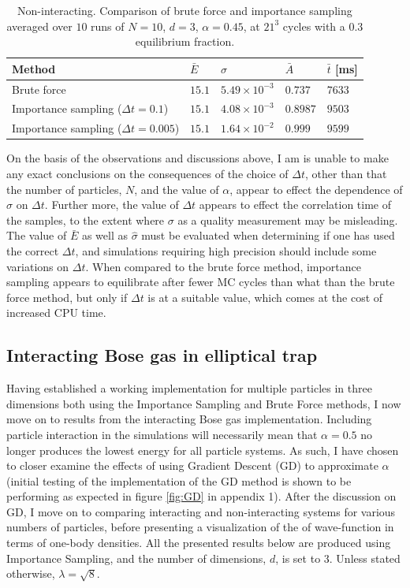 \documentclass[%
oneside,                 %
final,                   %
10pt]{article}
\begin{document}
\begin{table}[h!]
\begin{center}
\begin{tabular}{lllll}
\hline
Method									    & $\bar E $ & $\hat \sigma$		   & $\bar A$ & $\bar t$ [ms]  \\
\hline
Brute force 								& $15.1$  		&$5.49 \times 10^{-3}$ &  $0.737$ & $7633$\\
Importance sampling ($\Delta t=0.1$)		& $15.1$ 		&$4.08 \times 10^{-3}$ &  $0.8987$ & $9503$\\
Importance sampling ($\Delta t=0.005$)		& $15.1$ 		&$1.64 \times 10^{-2}$ &  $0.999$ & $9599$\\
\hline
\end{tabular}
\end{center}
\caption{Non-interacting. Comparison of brute force and importance sampling averaged over $10$ runs of $N=10$, $d=3$, $\alpha=0.45$, at $21^3$  cycles with a $0.3$ equilibrium fraction. }
\label{table:BF_IS}
\end{table}


On the basis of the observations and discussions above, I am is unable to make any exact conclusions on the consequences of the choice of $\Delta t$, other than that the number of particles, $N$, and the value of $\alpha$, appear to effect the dependence of $\hat \sigma$ on $\Delta t$. Further more, the value of $\Delta t$ appears to effect the correlation time of the samples, to the extent where $\sigma$ as a quality measurement may be misleading. The value of $\bar E$ as well as $\hat \sigma$ must be evaluated when determining if one has used the correct $\Delta t$, and simulations requiring high precision should include some variations on $\Delta t$. When compared to the brute force method, importance sampling appears to equilibrate after fewer MC cycles than what than the brute force method, but only if $\Delta t$ is at a suitable value, which comes at the cost of increased CPU time.

\subsection{Interacting Bose gas in elliptical trap}
Having established a working implementation for multiple particles in three dimensions both using the Importance Sampling and Brute Force methods, I now move on to results from the interacting Bose gas implementation. Including particle interaction in the simulations will necessarily mean that $\alpha=0.5$ no longer produces the lowest energy for all particle systems. As such, I have chosen to closer examine the effects of using Gradient Descent (GD) to approximate $\alpha$ (initial testing of the implementation of the GD method is shown to be performing as expected in figure \ref{fig:GD} in appendix 1). After the discussion on GD, I move on to comparing interacting and non-interacting systems for various numbers of particles, before presenting a visualization of the of wave-function in terms of one-body densities. All the presented results below are produced using Importance Sampling, and the number of dimensions, $d$, is set to $3$. Unless stated otherwise, $\lambda=\sqrt{8}$. 
\end{document}
